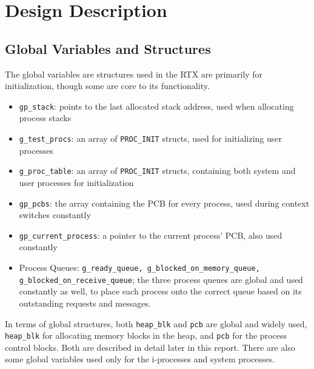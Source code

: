\documentclass[12pt]{report}
\begin{document}
\chapter{Design Description}

\section{Global Variables and Structures}

The global variables are structures used in the RTX are primarily for initialization, though
some are core to its functionality.
\begin{itemize}
	\item \texttt{gp\_stack}: points to the last allocated stack address, used when allocating process stacks
	\item \texttt{g\_test\_procs}: an array of \texttt{PROC\_INIT} structs, used for initializing user processes
	\item \texttt{g\_proc\_table}: an array of \texttt{PROC\_INIT} structs, containing both system and user processes for initialization
	\item \texttt{gp\_pcbs}: the array containing the PCB for every process, used during context switches constantly
	\item \texttt{gp\_current\_process}: a pointer to the current process' PCB, also used constantly
	\item Process Queues: \texttt{g\_ready\_queue, g\_blocked\_on\_memory\_queue, g_blocked_on_receive_queue};
		the three process queues are global and used constantly as well, to place each process
		onto the correct queue based on its outstanding requests and messages.
\end{itemize}
In terms of global structures, both \texttt{heap\_blk} and \texttt{pcb} are global
and widely used, \texttt{heap\_blk} for allocating memory blocks in the heap, and
\texttt{pcb} for the process control blocks. Both are described in detail later in this report.
There are also some global variables used only for the i-processes and system processes.
\end{document}
